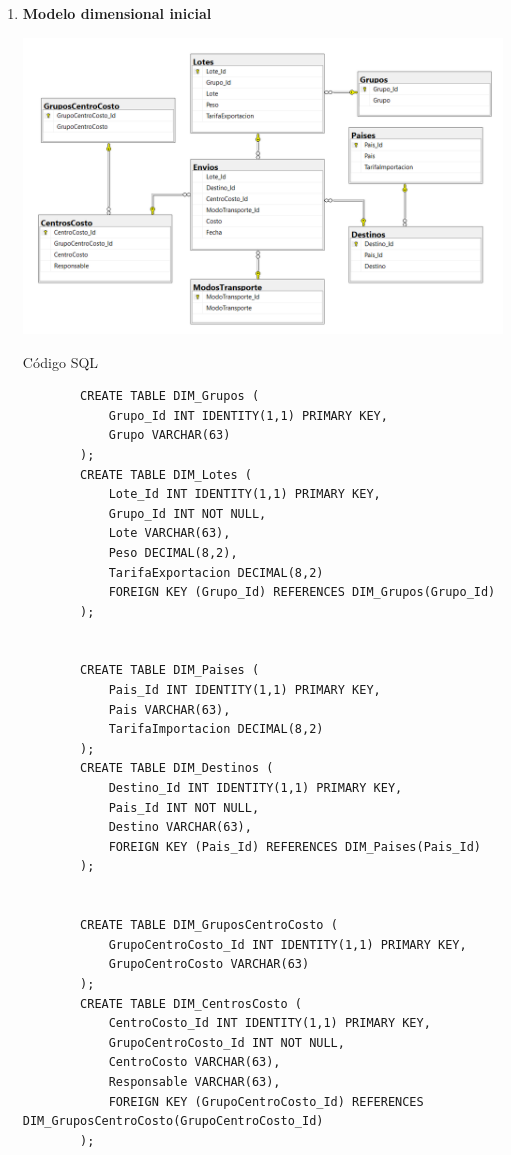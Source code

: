 \documentclass[12pt,letterpaper]{article}
\newcommand\tab[1][1cm]{\hspace*{#1}}
\begin{document}
\begin{enumerate}[\tab a.]
    \item \textbf{Modelo dimensional inicial}
    \begin{center}
        \includegraphics[width=16cm]{./img/img4.png}
    \end{center}
    \subitem Código SQL
    \begin{verbatim}
        CREATE TABLE DIM_Grupos (
            Grupo_Id INT IDENTITY(1,1) PRIMARY KEY,
            Grupo VARCHAR(63)
        );
        CREATE TABLE DIM_Lotes (
            Lote_Id INT IDENTITY(1,1) PRIMARY KEY,
            Grupo_Id INT NOT NULL,
            Lote VARCHAR(63),
            Peso DECIMAL(8,2),
            TarifaExportacion DECIMAL(8,2)
            FOREIGN KEY (Grupo_Id) REFERENCES DIM_Grupos(Grupo_Id)
        );
    
    
        CREATE TABLE DIM_Paises (
            Pais_Id INT IDENTITY(1,1) PRIMARY KEY,
            Pais VARCHAR(63),
            TarifaImportacion DECIMAL(8,2)
        );
        CREATE TABLE DIM_Destinos (
            Destino_Id INT IDENTITY(1,1) PRIMARY KEY,
            Pais_Id INT NOT NULL,
            Destino VARCHAR(63),
            FOREIGN KEY (Pais_Id) REFERENCES DIM_Paises(Pais_Id)
        );
    
    
        CREATE TABLE DIM_GruposCentroCosto (
            GrupoCentroCosto_Id INT IDENTITY(1,1) PRIMARY KEY,
            GrupoCentroCosto VARCHAR(63)
        );
        CREATE TABLE DIM_CentrosCosto (
            CentroCosto_Id INT IDENTITY(1,1) PRIMARY KEY,
            GrupoCentroCosto_Id INT NOT NULL,
            CentroCosto VARCHAR(63),
            Responsable VARCHAR(63),
            FOREIGN KEY (GrupoCentroCosto_Id) REFERENCES DIM_GruposCentroCosto(GrupoCentroCosto_Id)
        );
    

\end{verbatim}
\end{enumerate}
\end{document}
